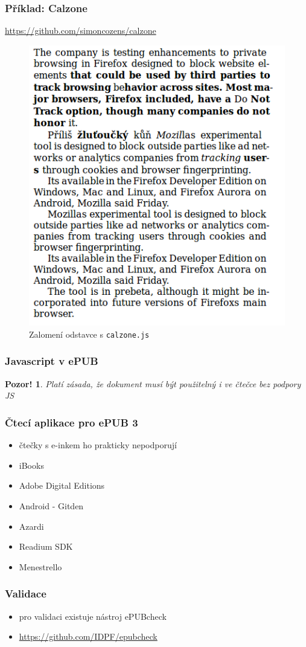 \documentclass[czech]{beamer}
\newtheorem{pozor}{Pozor!}
\begin{document}
\begin{frame}
        \frametitle{Příklad: Calzone }
\url{https://github.com/simoncozens/calzone}
\begin{figure}
  \includegraphics[width=.6\textwidth]{examples/with-calzone.png}
  \caption{Zalomení odstavce s \texttt{calzone.js}}
  \end{figure}
\end{frame}
\begin{frame}
  \frametitle{Javascript v ePUB}
\begin{pozor}
        Platí zásada, že dokument musí být použitelný i ve čtečce bez podpory JS
      \end{pozor}
\end{frame}
\begin{frame}
  \frametitle{Čtecí aplikace pro ePUB 3}
  \begin{itemize}
  \item čtečky s e-inkem ho prakticky nepodporují
  \item iBooks
  \item Adobe Digital Editions
  \item Android - Gitden
  \item Azardi
  \item Readium SDK
  \item Menestrello
\end{itemize}
\end{frame}
\begin{frame}
  \frametitle{Validace}
  \begin{itemize}
    \item pro validaci existuje nástroj ePUBcheck
    \item \url{https://github.com/IDPF/epubcheck}
  \end{itemize}
\end{frame}
\end{document}

